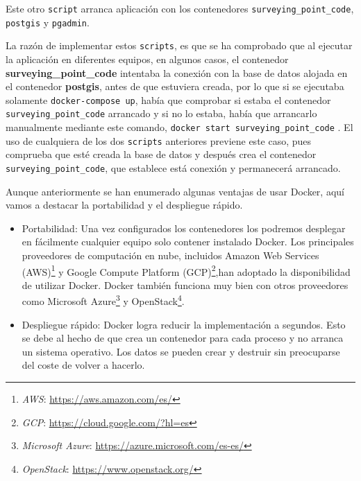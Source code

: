 Este otro \texttt{script} arranca aplicación con los contenedores \texttt{surveying\_point\_code}, \texttt{postgis} y \texttt{pgadmin}.

La razón de implementar estos \texttt{scripts}, es que se ha comprobado que al ejecutar la aplicación en diferentes equipos, en algunos casos, el contenedor \textbf{surveying\_point\_code} intentaba la conexión con la base de datos alojada en el contenedor \textbf{postgis}, antes de que estuviera creada, por lo que si se ejecutaba solamente \texttt{docker-compose up}, había que comprobar si estaba el contenedor 
\texttt{surveying\_point\_code} arrancado y si no lo estaba, había que arrancarlo manualmente mediante este comando, \texttt{docker start surveying\_point\_code} . El uso de cualquiera de los dos \texttt{scripts} anteriores previene este caso, pues comprueba que esté creada la base de datos y después crea el contenedor \texttt{surveying\_point\_code}, que establece está conexión y permanecerá arrancado.

Aunque anteriormente se han enumerado algunas ventajas de usar Docker, aquí vamos 
a destacar la portabilidad y el despliegue rápido.
\begin{itemize}
\item Portabilidad: Una vez configurados los contenedores los podremos desplegar en fácilmente cualquier equipo solo contener instalado Docker. Los principales proveedores de computación en nube, incluidos Amazon Web Services (AWS)\footnote{\textsl{AWS}: \url{https://aws.amazon.com/es/}} y Google Compute Platform (GCP)\footnote{\textsl{GCP}: \url{https://cloud.google.com/?hl=es}},han adoptado la disponibilidad de utilizar Docker. Docker también funciona muy bien con otros proveedores como Microsoft Azure\footnote{\textsl{Microsoft Azure}: \url{https://azure.microsoft.com/es-es/}} y OpenStack\footnote{\textsl{OpenStack}: \url{https://www.openstack.org/}}.
\item Despliegue rápido: Docker logra reducir la implementación a segundos. Esto se debe al hecho de que crea un contenedor para cada proceso y no arranca un sistema operativo. Los datos se pueden crear y destruir sin preocuparse del coste de volver a hacerlo.
\end{itemize}

